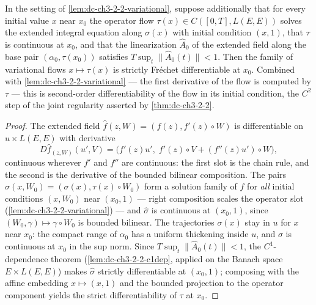 \begin{lemma}
  \label{lem:dc-ch3-2-2-c2dep}
  \leanok
  In the setting of \cref{lem:dc-ch3-2-2-variational}, suppose additionally
  that for every initial value $x$ near $x_0$ the operator flow
  $\tau(x) \in C([0,T], L(E,E))$ solves the extended integral equation along
  $\sigma(x)$ with initial condition $(x, 1)$, that $\tau$ is continuous at
  $x_0$, and that the linearization $\hat A_0$ of the extended field along the
  base pair $(\alpha_0, \tau(x_0))$ satisfies $T \sup_t \|\hat A_0(t)\| < 1$.
  Then the family of variational flows $x \mapsto \tau(x)$ is strictly
  Fr\'echet differentiable at $x_0$. Combined with
  \cref{lem:dc-ch3-2-2-variational} — the first derivative of the flow is
  computed by $\tau$ — this is second-order differentiability of the flow in
  its initial condition, the $C^2$ step of the joint regularity asserted by
  \cref{thm:dc-ch3-2-2}.
\end{lemma}
\begin{proof}
  \sketch
  \leanok
  The extended field $\hat f(z, W) = (f(z), f'(z) \circ W)$ is differentiable
  on $u \times L(E,E)$ with derivative
  $$D\hat f_{(z,W)}(u', V) = \big(f'(z)u',\; f'(z) \circ V
    + (f''(z)u') \circ W\big),$$
  continuous wherever $f'$ and $f''$ are continuous: the first slot is the
  chain rule, and the second is the derivative of the bounded bilinear
  composition. The pairs $\hat\sigma(x, W_0) = (\sigma(x), \tau(x) \circ W_0)$
  form a solution family of $\hat f$ for \emph{all} initial conditions
  $(x, W_0)$ near $(x_0, 1)$ — right composition scales the operator slot
  (\cref{lem:dc-ch3-2-2-variational}) — and $\hat\sigma$ is continuous at
  $(x_0, 1)$, since $(W_0, \gamma) \mapsto \gamma \circ W_0$ is bounded
  bilinear. The trajectories $\sigma(x)$ stay in $u$ for $x$ near $x_0$: the
  compact range of $\alpha_0$ has a uniform thickening inside $u$, and
  $\sigma$ is continuous at $x_0$ in the sup norm. Since
  $T \sup_t \|\hat A_0(t)\| < 1$, the $C^1$-dependence theorem
  (\cref{lem:dc-ch3-2-2-c1dep}, applied on the Banach space
  $E \times L(E,E)$) makes $\hat\sigma$ strictly differentiable at $(x_0, 1)$;
  composing with the affine embedding $x \mapsto (x, 1)$ and the bounded
  projection to the operator component yields the strict differentiability of
  $\tau$ at $x_0$.
\end{proof}

